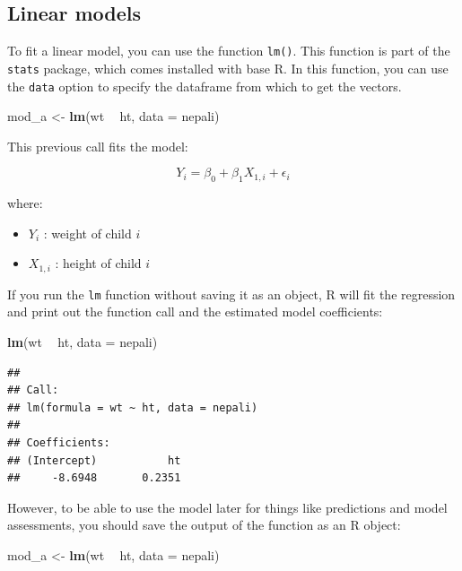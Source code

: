\documentclass[]{book}
\makeatletter
\newenvironment{Shaded}{\begin{snugshade}}{\end{snugshade}}
\newcommand{\KeywordTok}[1]{\textcolor[rgb]{0.13,0.29,0.53}{\textbf{#1}}}
\newcommand{\DataTypeTok}[1]{\textcolor[rgb]{0.13,0.29,0.53}{#1}}
\newcommand{\StringTok}[1]{\textcolor[rgb]{0.31,0.60,0.02}{#1}}
\newcommand{\OperatorTok}[1]{\textcolor[rgb]{0.81,0.36,0.00}{\textbf{#1}}}
\newcommand{\NormalTok}[1]{#1}
\providecommand{\tightlist}{%
  \setlength{\itemsep}{0pt}\setlength{\parskip}{0pt}}
\newenvironment{kframe}{%
\medskip{}
\setlength{\fboxsep}{.8em}
 \def\at@end@of@kframe{}%
 \ifinner\ifhmode%
  \def\at@end@of@kframe{\end{minipage}}%
  \begin{minipage}{\columnwidth}%
 \fi\fi%
 \def\FrameCommand##1{\hskip\@totalleftmargin \hskip-\fboxsep
 \colorbox{shadecolor}{##1}\hskip-\fboxsep
     \hskip-\linewidth \hskip-\@totalleftmargin \hskip\columnwidth}%
 \MakeFramed {\advance\hsize-\width
   \@totalleftmargin\z@ \linewidth\hsize
   \@setminipage}}%
 {\par\unskip\endMakeFramed%
 \at@end@of@kframe}
\renewenvironment{Shaded}{\begin{kframe}}{\end{kframe}}
\theoremstyle{definition}
\theoremstyle{definition}
\theoremstyle{definition}
\theoremstyle{remark}
\makeatother
\begin{document}
\subsection{Linear models}\label{linear-models}

To fit a linear model, you can use the function \texttt{lm()}. This
function is part of the \texttt{stats} package, which comes installed
with base R. In this function, you can use the \texttt{data} option to
specify the dataframe from which to get the vectors.

\begin{Shaded}
\begin{Highlighting}[]
\NormalTok{mod_a <-}\StringTok{ }\KeywordTok{lm}\NormalTok{(wt }\OperatorTok{~}\StringTok{ }\NormalTok{ht, }\DataTypeTok{data =}\NormalTok{ nepali)}
\end{Highlighting}
\end{Shaded}

This previous call fits the model:

\[ Y_{i} = \beta_{0} + \beta_{1}X_{1,i} + \epsilon_{i} \]

where:

\begin{itemize}
\tightlist
\item
  \(Y_{i}\) : weight of child \(i\)
\item
  \(X_{1,i}\) : height of child \(i\)
\end{itemize}

If you run the \texttt{lm} function without saving it as an object, R
will fit the regression and print out the function call and the
estimated model coefficients:

\begin{Shaded}
\begin{Highlighting}[]
\KeywordTok{lm}\NormalTok{(wt }\OperatorTok{~}\StringTok{ }\NormalTok{ht, }\DataTypeTok{data =}\NormalTok{ nepali)}
\end{Highlighting}
\end{Shaded}

\begin{verbatim}
## 
## Call:
## lm(formula = wt ~ ht, data = nepali)
## 
## Coefficients:
## (Intercept)           ht  
##     -8.6948       0.2351
\end{verbatim}

However, to be able to use the model later for things like predictions
and model assessments, you should save the output of the function as an
R object:

\begin{Shaded}
\begin{Highlighting}[]
\NormalTok{mod_a <-}\StringTok{ }\KeywordTok{lm}\NormalTok{(wt }\OperatorTok{~}\StringTok{ }\NormalTok{ht, }\DataTypeTok{data =}\NormalTok{ nepali)}
\end{Highlighting}
\end{Shaded}
\end{document}
